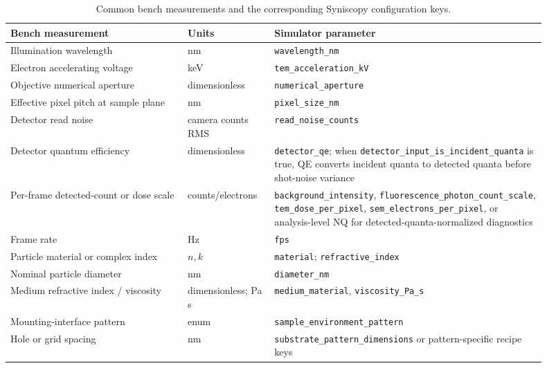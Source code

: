 \begin{table}[H]
\centering
\small
\begin{tabular}{p{0.30\linewidth}p{0.14\linewidth}p{0.46\linewidth}}
\toprule
Bench measurement & Units & Simulator parameter \\
\midrule
Illumination wavelength & nm & \texttt{wavelength\_nm} \\
Electron accelerating voltage & keV & \texttt{tem\_acceleration\_kV} \\
Objective numerical aperture & dimensionless & \texttt{numerical\_aperture} \\
Effective pixel pitch at sample plane & nm & \texttt{pixel\_size\_nm} \\
Detector read noise & camera counts RMS & \texttt{read\_noise\_counts} \\
Detector quantum efficiency & dimensionless & \texttt{detector\_qe}; when \texttt{detector\_input\_is\_incident\_quanta} is true, QE converts incident quanta to detected quanta before shot-noise variance \\
Per-frame detected-count or dose scale & counts/electrons & \texttt{background\_intensity}, \texttt{fluorescence\_photon\_count\_scale}, \texttt{tem\_dose\_per\_pixel}, \texttt{sem\_electrons\_per\_pixel}, or analysis-level NQ for detected-quanta-normalized diagnostics \\
Frame rate & Hz & \texttt{fps} \\
Particle material or complex index & $n,k$ & \texttt{material}; \texttt{refractive\_index} \\
Nominal particle diameter & nm & \texttt{diameter\_nm} \\
Medium refractive index / viscosity & dimensionless; Pa\,s & \texttt{medium\_material}, \texttt{viscosity\_Pa\_s} \\
Mounting-interface pattern & enum & \texttt{sample\_environment\_pattern} \\
Hole or grid spacing & nm & \texttt{substrate\_pattern\_dimensions} or pattern-specific recipe keys \\
\bottomrule
\end{tabular}
\caption{Common bench measurements and the corresponding Syniscopy configuration keys.}
\label{tab:bench-mapping}
\end{table}

